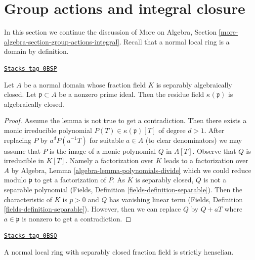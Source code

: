 \section{Group actions and integral closure}
\label{pione-section-group-actions-integral}
In this section we continue the discussion of
More on Algebra, Section \ref{more-algebra-section-group-actions-integral}.
Recall that a normal local ring is a domain by definition.

\begin{lemma}
\label{pione-lemma-get-algebraic-closure}
\href{https://stacks.math.columbia.edu/tag/0BSP}{\texttt{Stacks tag 0BSP}}

Let $A$ be a normal domain whose fraction field $K$ is separably algebraically
closed. Let $\mathfrak p \subset A$ be a nonzero prime ideal.
Then the residue field $\kappa(\mathfrak p)$ is algebraically closed.
\end{lemma}

\begin{proof}
Assume the lemma is not true to get a contradiction. Then there exists a
monic irreducible polynomial $P(T) \in \kappa(\mathfrak p)[T]$ of
degree $d > 1$. After replacing $P$ by $a^d P(a^{-1}T)$ for suitable $a \in A$
(to clear denominators) we may assume that $P$ is the image of a
monic polynomial $Q$ in $A[T]$. Observe that $Q$ is irreducible in
$K[T]$. Namely a factorization over $K$ leads to a factorization
over $A$ by Algebra, Lemma \ref{algebra-lemma-polynomials-divide}
which we could reduce modulo $\mathfrak p$ to get a factorization of $P$.
As $K$ is separably closed, $Q$ is not a separable polynomial
(Fields, Definition \ref{fields-definition-separable}).
Then the characteristic of $K$ is $p > 0$ and $Q$ has
vanishing linear term (Fields, Definition \ref{fields-definition-separable}).
However, then we can replace $Q$ by
$Q + a T$ where $a \in \mathfrak p$ is nonzero to get a contradiction.
\end{proof}

\begin{lemma}
\label{pione-lemma-normal-local-domain-separablly-closed-fraction-field}
\href{https://stacks.math.columbia.edu/tag/0BSQ}{\texttt{Stacks tag 0BSQ}}

A normal local ring with separably closed fraction field is
strictly henselian.
\end{lemma}

